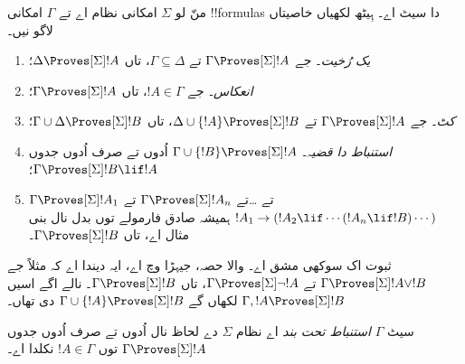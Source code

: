 \documentclass[../../../include/open-logic-section]{subfiles}
\begin{document}


\begin{prop}
  منّ لو $\Sigma$ امکانی نظام اے تے $\Gamma$ امکانی
  !!{formula}s دا سیٹ اے۔ ہِیٹھ لکھیاں خاصیتاں لاگو نیں۔
  \begin{enumerate}
  \item{} \emph{یک رُخیت}۔ جے
    $\Gamma \Proves[\Sigma] !A$ تے $\Gamma \subseteq \Delta$، تاں
    $\Delta \Proves[\Sigma] !A$؛
  \item{}
    \emph{انعکاس}۔ جے $!A \in \Gamma$، تاں $\Gamma
    \Proves[\Sigma] !A$؛
  \item{} \emph{کٹ}۔ جے $\Gamma
    \Proves[\Sigma] !A$ تے $\Delta \cup \{!A\} \Proves[\Sigma] !B$،
    تاں $\Gamma \cup \Delta \Proves[\Sigma] !B$؛
  \item{} \emph{استنباط دا قضیہ}۔ $\Gamma \cup \{!B\}
    \Proves[\Sigma] !A$ اُدوں تے صرف اُدوں جدوں $\Gamma \Proves[\Sigma] !B \lif
      !A$؛
  \item {}%
    $\Gamma \Proves[\Sigma] !A_1$ تے \dots تے $\Gamma
    \Proves[\Sigma] !A_n$ تے $!A_1 \to (!A_2 \lif \cdots (!A_n \lif
    !B)\cdots)$ ہمیشہ صادق فارمولے توں بدل نال بنی مثال اے، تاں $\Gamma
    \Proves[\Sigma] !B$۔
  \end{enumerate}
\end{prop}

ثبوت اک سوکھی مشق اے۔  والا حصہ، جیہڑا  وچ اے، ایہ دیندا اے کہ مثلاً جے $\Gamma \Proves[\Sigma] !A \lor !B$
تے $\Gamma \Proves[\Sigma] \lnot !A$، تاں $\Gamma \Proves[\Sigma]
!B$۔ نالے اگے اسیں $\Gamma, !A \Proves[\Sigma] !B$
لکھاں گے $\Gamma \cup \{ !A\} \Proves[\Sigma] !B$ دی تھاں۔

\begin{defn}
  سیٹ $\Gamma$ \emph{استنباط تحت بند} اے نظام
  $\Sigma$ دے لحاظ نال اُدوں تے صرف اُدوں جدوں $\Gamma \Proves[\Sigma] !A$ توں
  $!A \in \Gamma$ نکلدا اے۔
\end{defn}
\end{document}
